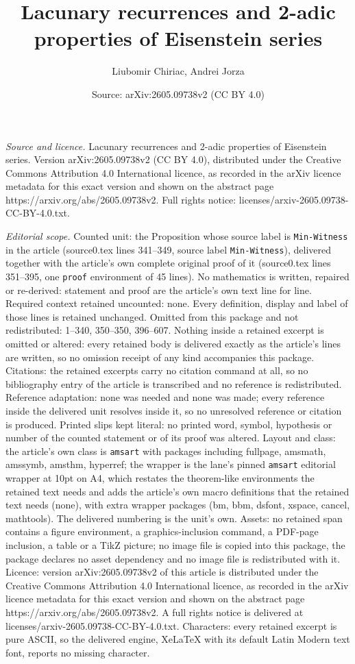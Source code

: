 \documentclass[10pt,a4paper]{amsart}
\title[Lacunary recurrences and 2-adic properties of Eisenstein ser]{Lacunary recurrences and 2-adic properties of Eisenstein series}
\author{Liubomir Chiriac, Andrei Jorza}
\date{Source: arXiv:2605.09738v2 (CC BY 4.0)}
\begin{document}
\maketitle

\noindent\emph{Source and licence.} Lacunary recurrences and 2-adic properties of Eisenstein series. Version arXiv:2605.09738v2 (CC BY 4.0), distributed under the Creative Commons Attribution 4.0 International licence, as recorded in the arXiv licence metadata for this exact version and shown on the abstract page https://arxiv.org/abs/2605.09738v2. Full rights notice: licenses/arxiv-2605.09738-CC-BY-4.0.txt.\par\smallskip

\noindent\textit{Editorial scope.} Counted unit: the Proposition whose source label is \texttt{Min-Witness} in the article (source0.tex lines 341--349, source label \texttt{Min-Witness}), delivered together with the article's own complete original proof of it (source0.tex lines 351--395, one \texttt{proof} environment of 45 lines). No mathematics is written, repaired or re-derived: statement and proof are the article's own text line for line. Required context retained uncounted: none. Every definition, display and label of those lines is retained unchanged. Omitted from this package and not redistributed: 1--340, 350--350, 396--607. Nothing inside a retained excerpt is omitted or altered: every retained body is delivered exactly as the article's lines are written, so no omission receipt of any kind accompanies this package. Citations: the retained excerpts carry no citation command at all, so no bibliography entry of the article is transcribed and no reference is redistributed. Reference adaptation: none was needed and none was made; every reference inside the delivered unit resolves inside it, so no unresolved reference or citation is produced. Printed slips kept literal: no printed word, symbol, hypothesis or number of the counted statement or of its proof was altered. Layout and class: the article's own class is \texttt{amsart} with packages including fullpage, amsmath, amssymb, amsthm, hyperref; the wrapper is the lane's pinned \texttt{amsart} editorial wrapper at 10pt on A4, which restates the theorem-like environments the retained text needs and adds the article's own macro definitions that the retained text needs (none), with extra wrapper packages (bm, bbm, dsfont, xspace, cancel, mathtools). The delivered numbering is the unit's own. Assets: no retained span contains a figure environment, a graphics-inclusion command, a PDF-page inclusion, a table or a TikZ picture; no image file is copied into this package, the package declares no asset dependency and no image file is redistributed with it. Licence: version arXiv:2605.09738v2 of this article is distributed under the Creative Commons Attribution 4.0 International licence, as recorded in the arXiv licence metadata for this exact version and shown on the abstract page https://arxiv.org/abs/2605.09738v2. A full rights notice is delivered at licenses/arxiv-2605.09738-CC-BY-4.0.txt. Characters: every retained excerpt is pure ASCII, so the delivered engine, XeLaTeX with its default Latin Modern text font, reports no missing character.
\end{document}
